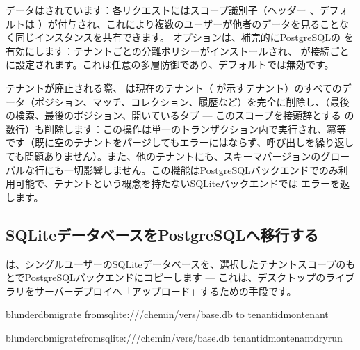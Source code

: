 \documentclass[letterpaper,10pt,dvipdfmx]{sphinxmanual}
\begin{document}
\sphinxAtStartPar
データはされています：各リクエストにはスコープ識別子（ヘッダー 、デフォルトは ）が付与され、これにより複数のユーザーが他者のデータを見ることなく同じインスタンスを共有できます。 オプションは、補完的にPostgreSQLの  を有効にします：テナントごとの分離ポリシーがインストールされ、 が接続ごとに設定されます。これは任意の多層防御であり、デフォルトでは無効です。

\sphinxAtStartPar
テナントが廃止される際、 は現在のテナント（ が示すテナント）のすべてのデータ（ポジション、マッチ、コレクション、履歴など）を完全に削除し、（最後の検索、最後のポジション、開いているタブ — このスコープを接頭辞とする  の数行）も削除します：この操作は単一のトランザクション内で実行され、冪等です（既に空のテナントをパージしてもエラーにはならず、呼び出しを繰り返しても問題ありません）。また、他のテナントにも、スキーマバージョンのグローバルな行にも一切影響しません。この機能はPostgreSQLバックエンドでのみ利用可能で、テナントという概念を持たないSQLiteバックエンドでは  エラーを返します。


\subsection{SQLiteデータベースをPostgreSQLへ移行する}
\label{\detokenize{mode_headless:migrer-une-base-sqlite-vers-postgresql}}\label{\detokenize{mode_headless:headless-migrate}}
\sphinxAtStartPar
{} は、シングルユーザーのSQLiteデータベースを、選択したテナントスコープのもとでPostgreSQLバックエンドにコピーします — これは、デスクトップのライブラリをサーバーデプロイへ「アップロード」するための手段です。

\begin{sphinxVerbatim}[commandchars=\\\{\}]
blunderdbmigrate
\PYGZhy{}\PYGZhy{}fromsqlite:///chemin/vers/base.db
\PYGZhy{}\PYGZhy{}to
\PYGZhy{}\PYGZhy{}tenant\PYGZhy{}idmon\PYGZhy{}tenant

blunderdbmigrate\PYGZhy{}\PYGZhy{}fromsqlite:///chemin/vers/base.db
\PYGZhy{}\PYGZhy{}tenant\PYGZhy{}idmon\PYGZhy{}tenant\PYGZhy{}\PYGZhy{}dry\PYGZhy{}run
\end{sphinxVerbatim}
\end{document}

